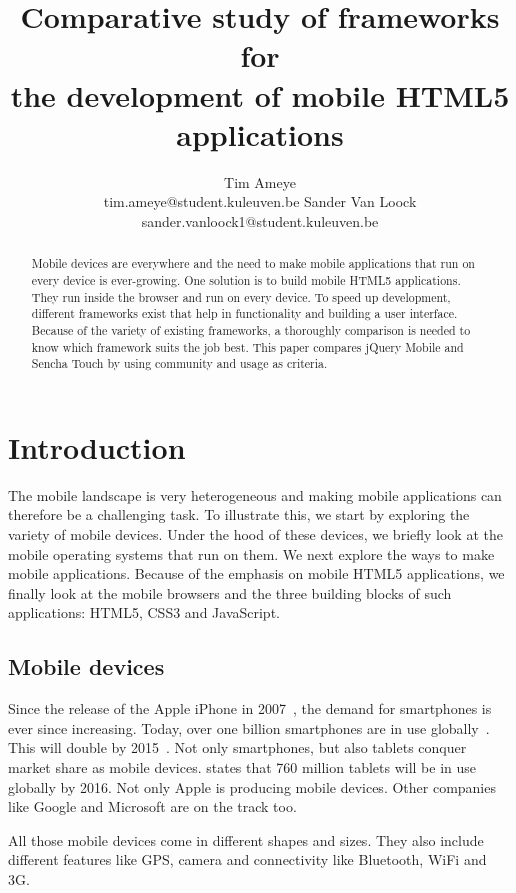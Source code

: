 \documentclass[a4paper]{artikel3}
\title{Comparative study of frameworks for \\ the development of mobile HTML5 applications}
\author{Tim Ameye \\ tim.ameye@student.kuleuven.be \And Sander Van Loock \\ sander.vanloock1@student.kuleuven.be}
\begin{document}
\maketitle

\begin{abstract}
Mobile devices are everywhere and the need to make mobile applications that run on every device is ever-growing.
One solution is to build mobile HTML5 applications.
They run inside the browser and run on every device.
To speed up development, different frameworks exist that help in functionality and building a user interface.
Because of the variety of existing frameworks, a thoroughly comparison is needed to know which framework suits the job best.
This paper compares jQuery Mobile and Sencha Touch by using community and usage as criteria.
\end{abstract}

\section{Introduction} %
\label{sec:introduction}
The mobile landscape is very heterogeneous and making mobile applications can therefore be a challenging task.
To illustrate this, we start by exploring the variety of mobile devices.
Under the hood of these devices, we briefly look at the mobile operating systems that run on them. 
We next explore the ways to make mobile applications.
Because of the emphasis on mobile HTML5 applications, we finally look at the mobile browsers and the three building blocks of such applications: HTML5, CSS3 and JavaScript.

\subsection{Mobile devices}
Since the release of the Apple iPhone in 2007~\cite{David2011}, the demand for smartphones is ever since increasing. 
Today, over one billion smartphones are in use globally~\cite{Yang2012}.
This will double by 2015~\cite{Gillett2012}.
Not only smartphones, but also tablets conquer market share as mobile devices.
\cite{Gillett2012} states that 760 million tablets will be in use globally by 2016.
Not only Apple is producing mobile devices.
Other companies like Google and Microsoft are on the track too.

All those mobile devices come in different shapes and sizes.
They also include different features like GPS, camera and connectivity like Bluetooth, WiFi and 3G.
\end{document}
